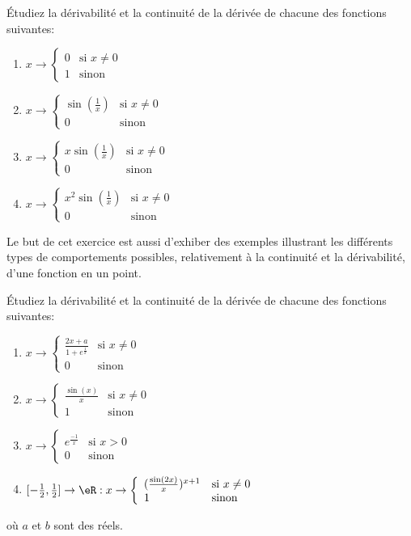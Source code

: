\exerNico Étudiez la dérivabilité et la continuité
de la dérivée de chacune des fonctions suivantes:
\begin{enumerate}
\item $ x \rightarrow
\left\{ \begin{array}{ll}
0 & \mbox{si } x \not= 0 \\
1 & \mbox{sinon}
\end{array} \right.$
%
\item $ x \rightarrow
\left\{ \begin{array}{ll}
\sin(\frac{1}{x}) & \mbox{si } x \not= 0 \\
0 & \mbox{sinon}
\end{array} \right.$
%
\item $ x \rightarrow
\left\{ \begin{array}{ll}
x \sin(\frac{1}{x}) & \mbox{si } x \not= 0 \\
0 & \mbox{sinon}
\end{array} \right.$
%
\item $ x \rightarrow
\left\{ \begin{array}{ll}
x^2 \sin(\frac{1}{x}) & \mbox{si } x \not= 0 \\
0 & \mbox{sinon}
\end{array} \right.$
\end{enumerate}

Le but de cet exercice est aussi d'exhiber des exemples illustrant les
différents types de comportements possibles, relativement à la
continuité et la dérivabilité, d'une fonction en un point.

\exerNico Étudiez la dérivabilité et la continuité
de la dérivée de chacune des fonctions suivantes:
\begin{enumerate}
\item $ x \rightarrow
\left\{ \begin{array}{ll}
\frac{2x+a}{1+e^{\frac{1}{x}}} & \mbox{si } x \not= 0 \\
0 & \mbox{sinon}
\end{array} \right.$
%
\item $ x \rightarrow
\left\{ \begin{array}{ll}
\frac{\sin(x)}{x} & \mbox{si } x \not= 0 \\
1 & \mbox{sinon}
\end{array} \right.$
%
\item $ x \rightarrow
\left\{ \begin{array}{ll}
e^{\frac{-1}{x}} & \mbox{si } x > 0 \\
0 & \mbox{sinon}
\end{array} \right.$
%
\item $ [-\frac{1}{2}, \frac{1}{2}] \rightarrow \eR: x \rightarrow
\left\{ \begin{array}{ll}
(\frac{\sin(2x)}{x})^{x+1} & \mbox{si } x \not= 0 \\
1 & \mbox{sinon}
\end{array} \right.$
\end{enumerate}
où $a$ et $b$ sont des réels.


